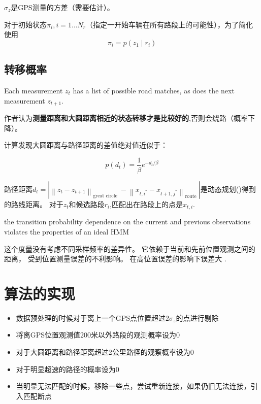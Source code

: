 $\sigma_{z}$是GPS测量的方差（需要估计）。 

对于初始状态$ \pi_{i} ,i=1 \ldots N_{r} $（指定一开始车辆在所有路段上的可能性），为了简化使用\begin{equation} \pi_{i}=p\left(z_{1} \mid r_{i}\right) \end{equation}

\subsection{转移概率}

Each measurement $ z_{t} $ has a list of possible road matches, as does the next measurement $ z_{t+1} $. 

作者认为\textbf{测量距离和大圆距离相近的状态转移才是比较好的},否则会绕路（概率下降）。 

计算发现大圆距离与路径距离的差值绝对值近似于：

\begin{equation} p\left(d_{t}\right)=\frac{1}{\beta} e^{-d_{t} / \beta} \end{equation}

路径距离$ d_{t}=\left| \left\|z_{t}-z_{t+1}\right\|_{\text {great circle }}-\left\|x_{t, i^{*}}-x_{t+1, j^{*}}\right\|_{\text {route }}\right| $是动态规划()得到的路线距离。 对于$z_t$和候选路段$r_i$,匹配出在路段上的点是$ x_{t, i} $. 

\begin{remark}
      \label{Comment:HMM-TransitionProbability}

      the transition probability
        dependence on the current and previous observations
    violates the properties of an ideal HMM

    这个度量没有考虑不同采样频率的差异性。 它依赖于当前和先前位置观测之间的距离， 受到位置测量误差的不利影响。 在高位置误差的影响下误差大 \cite{Jagadeesh2017}.
\end{remark}

\section{算法的实现}

\begin{itemize}
    \item 数据预处理的时候对于离上一个GPS点位置超过$ 2 \sigma_{z} $的点进行剔除
    \item 将离GPS位置观测值200米以外路段的观测概率设为0
    \item 对于大圆距离和路径距离超过2公里路径的观察概率设为0
    \item 对于明显超速的路径的概率设为0
    \item 当明显无法匹配的时候，移除一些点，尝试重新连接，如果仍旧无法连接，引入匹配断点
\end{itemize}

